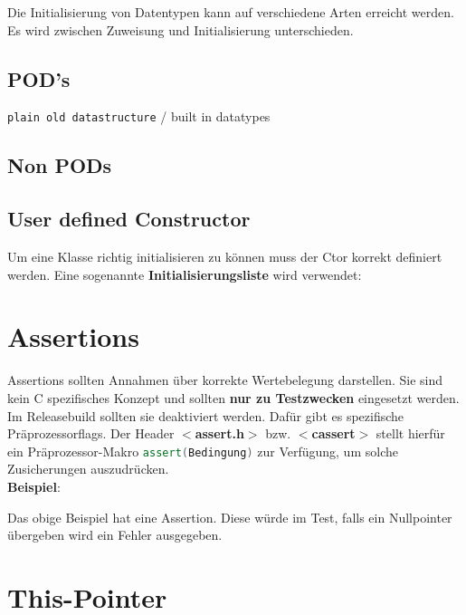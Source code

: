 Die Initialisierung von Datentypen kann auf verschiedene Arten erreicht werden. 
Es wird zwischen Zuweisung und Initialisierung unterschieden.

\subsection{POD's}

\texttt{plain old datastructure} / built in datatypes



\subsection{Non PODs}



\subsection{User defined Constructor}\label{chap:user_ctor}

Um eine Klasse richtig initialisieren zu können muss der Ctor korrekt definiert werden.
Eine sogenannte \textbf{Initialisierungsliste} wird verwendet:



\section{Assertions}
Assertions sollten Annahmen über korrekte Wertebelegung darstellen.
Sie sind kein C spezifisches Konzept und sollten \textbf{nur zu Testzwecken} eingesetzt werden. 
Im Releasebuild sollten sie deaktiviert werden. Dafür gibt es spezifische Präprozessorflags.
Der Header \textbf{$<$assert.h$>$} bzw. \textbf{$<$cassert$>$} stellt hierfür ein Präprozessor-Makro \lstinline[language=C++]|assert(Bedingung)|
zur Verfügung, um solche Zusicherungen auszudrücken.\\
\textbf{Beispiel}:



Das obige Beispiel hat eine Assertion. 
Diese würde im Test, falls ein Nullpointer übergeben wird ein Fehler ausgegeben.

\section{This-Pointer}


